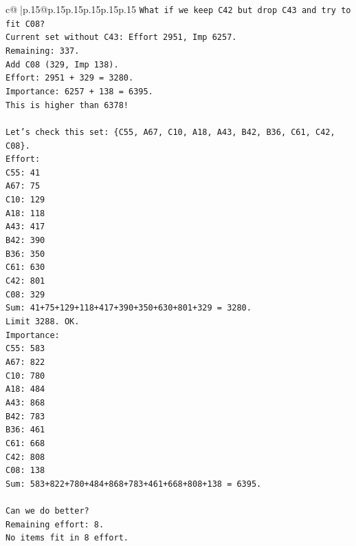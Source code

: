 \documentclass{article}
\begin{document}
{\begin{supertabular}{c@{$\;$}|p{.15\linewidth}@{}p{.15\linewidth}p{.15\linewidth}p{.15\linewidth}p{.15\linewidth}p{.15\linewidth}}
{{{\texttt{What if we keep C42 but drop C43 and try to fit C08?} \\
\texttt{Current set without C43: Effort 2951, Imp 6257.} \\
\texttt{Remaining: 337.} \\
\texttt{Add C08 (329, Imp 138).} \\
\texttt{Effort: 2951 + 329 = 3280.} \\
\texttt{Importance: 6257 + 138 = 6395.} \\
\texttt{This is higher than 6378!} \\
\\ 
\texttt{Let's check this set: \{C55, A67, C10, A18, A43, B42, B36, C61, C42, C08\}.} \\
\texttt{Effort:} \\
\texttt{C55: 41} \\
\texttt{A67: 75} \\
\texttt{C10: 129} \\
\texttt{A18: 118} \\
\texttt{A43: 417} \\
\texttt{B42: 390} \\
\texttt{B36: 350} \\
\texttt{C61: 630} \\
\texttt{C42: 801} \\
\texttt{C08: 329} \\
\texttt{Sum: 41+75+129+118+417+390+350+630+801+329 = 3280.} \\
\texttt{Limit 3288. OK.} \\
\texttt{Importance:} \\
\texttt{C55: 583} \\
\texttt{A67: 822} \\
\texttt{C10: 780} \\
\texttt{A18: 484} \\
\texttt{A43: 868} \\
\texttt{B42: 783} \\
\texttt{B36: 461} \\
\texttt{C61: 668} \\
\texttt{C42: 808} \\
\texttt{C08: 138} \\
\texttt{Sum: 583+822+780+484+868+783+461+668+808+138 = 6395.} \\
\\ 
\texttt{Can we do better?} \\
\texttt{Remaining effort: 8.} \\
\texttt{No items fit in 8 effort.} \\
}}}
\end{supertabular}}
\end{document}
